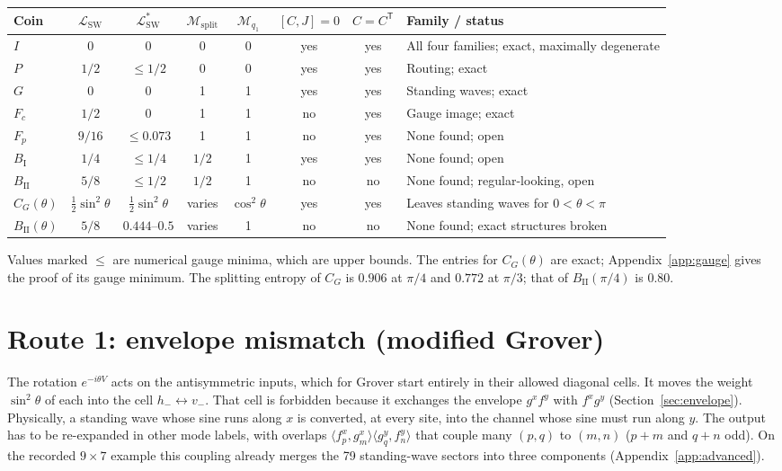 \documentclass[11pt,a4paper,oneside]{report}
\newcommand{\Id}{I}
\newcommand{\sw}{\mathrm{SW}}
\numberwithin{equation}{chapter}
\begin{document}
\begin{center}\small
\begin{tabularx}{\textwidth}{@{}lccccccY@{}}\toprule
Coin&\(\mathcal L_{\sw}\)&\(\mathcal L^*_{\sw}\)&\(\mathcal M_{\mathrm{split}}\)&\(\mathcal M_{q_1}\)&\([C,J]=0\)&\(C=C^{\mathsf T}\)&Family / status\\\midrule
\(\Id\)&0&0&0&0&yes&yes&All four families; exact, maximally degenerate\\
\(P\)&\(1/2\)&\(\le1/2\)&0&0&yes&yes&Routing; exact\\
\(G\)&0&0&1&1&yes&yes&Standing waves; exact\\
\(F_c\)&\(1/2\)&0&1&1&no&yes&Gauge image; exact\\
\(F_p\)&\(9/16\)&\(\le0.073\)&1&1&no&yes&None found; open\\
\(B_{\mathrm I}\)&\(1/4\)&\(\le1/4\)&\(1/2\)&1&yes&yes&None found; open\\
\(B_{\mathrm{II}}\)&\(5/8\)&\(\le1/2\)&\(1/2\)&1&no&no&None found; regular-looking, open\\
\(C_G(\theta)\)&\(\tfrac12\sin^2\theta\)&\(\tfrac12\sin^2\theta\)&varies&\(\cos^2\theta\)&yes&yes&Leaves standing waves for \(0<\theta<\pi\)\\
\(B_{\mathrm{II}}(\theta)\)&\(5/8\)&\(0.444\)--\(0.5\)&varies&1&no&no&None found; exact structures broken\\\bottomrule
\end{tabularx}
\end{center}
Values marked \(\le\) are numerical gauge minima, which are upper bounds.
The entries for \(C_G(\theta)\) are exact; Appendix~\ref{app:gauge} gives
the proof of its gauge minimum. The splitting entropy of \(C_G\) is
\(0.906\) at \(\pi/4\) and \(0.772\) at \(\pi/3\); that of
\(B_{\mathrm{II}}(\pi/4)\) is \(0.80\).

\section{Route 1: envelope mismatch (modified Grover)}

The rotation \(e^{-i\theta V}\) acts on the antisymmetric inputs, which
for Grover start entirely in their allowed diagonal cells. It moves the
weight \(\sin^2\theta\) of each into the cell \(h_-\leftrightarrow v_-\).
That cell is forbidden because it exchanges the envelope \(g^xf^y\) with
\(f^xg^y\) (Section~\ref{sec:envelope}). Physically, a standing wave
whose sine runs along \(x\) is converted, at every site, into the channel
whose sine must run along \(y\). The output has to be re-expanded in other
mode labels, with overlaps
\(\langle f_p^x,g_m^x\rangle\langle g_q^y,f_n^y\rangle\) that couple many
\((p,q)\) to \((m,n)\) (\(p+m\) and \(q+n\) odd). On the recorded
\(9\times7\) example this coupling already merges the 79 standing-wave
sectors into three components (Appendix~\ref{app:advanced}).
\end{document}
